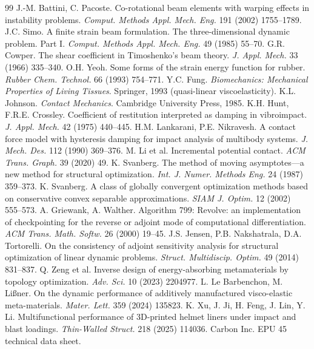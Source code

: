 \documentclass[11pt,a4paper]{article}
\begin{document}
\begin{thebibliography}{99}
 J.-M. Battini, C. Pacoste. Co-rotational beam elements with warping effects in instability problems. \emph{Comput. Methods Appl. Mech. Eng.} 191 (2002) 1755--1789.
 J.C. Simo. A finite strain beam formulation. The three-dimensional dynamic problem. Part I. \emph{Comput. Methods Appl. Mech. Eng.} 49 (1985) 55--70.
 G.R. Cowper. The shear coefficient in Timoshenko's beam theory. \emph{J. Appl. Mech.} 33 (1966) 335--340.
 O.H. Yeoh. Some forms of the strain energy function for rubber. \emph{Rubber Chem. Technol.} 66 (1993) 754--771.
 Y.C. Fung. \emph{Biomechanics: Mechanical Properties of Living Tissues}. Springer, 1993 (quasi-linear viscoelasticity).
 K.L. Johnson. \emph{Contact Mechanics}. Cambridge University Press, 1985.
 K.H. Hunt, F.R.E. Crossley. Coefficient of restitution interpreted as damping in vibroimpact. \emph{J. Appl. Mech.} 42 (1975) 440--445.
 H.M. Lankarani, P.E. Nikravesh. A contact force model with hysteresis damping for impact analysis of multibody systems. \emph{J. Mech. Des.} 112 (1990) 369--376.
 M. Li et al. Incremental potential contact. \emph{ACM Trans. Graph.} 39 (2020) 49.
 K. Svanberg. The method of moving asymptotes---a new method for structural optimization. \emph{Int. J. Numer. Methods Eng.} 24 (1987) 359--373.
 K. Svanberg. A class of globally convergent optimization methods based on conservative convex separable approximations. \emph{SIAM J. Optim.} 12 (2002) 555--573.
 A. Griewank, A. Walther. Algorithm 799: Revolve: an implementation of checkpointing for the reverse or adjoint mode of computational differentiation. \emph{ACM Trans. Math. Softw.} 26 (2000) 19--45.
 J.S. Jensen, P.B. Nakshatrala, D.A. Tortorelli. On the consistency of adjoint sensitivity analysis for structural optimization of linear dynamic problems. \emph{Struct. Multidiscip. Optim.} 49 (2014) 831--837.
 Q. Zeng et al. Inverse design of energy-absorbing metamaterials by topology optimization. \emph{Adv. Sci.} 10 (2023) 2204977.
 L. Le Barbenchon, M. Li{\ss}ner. On the dynamic performance of additively manufactured visco-elastic meta-materials. \emph{Mater. Lett.} 359 (2024) 135823.
 K. Xu, J. Ji, H. Feng, J. Lin, Y. Li. Multifunctional performance of 3D-printed helmet liners under impact and blast loadings. \emph{Thin-Walled Struct.} 218 (2025) 114036.
 Carbon Inc. EPU 45 technical data sheet.
\end{thebibliography}
\end{document}
